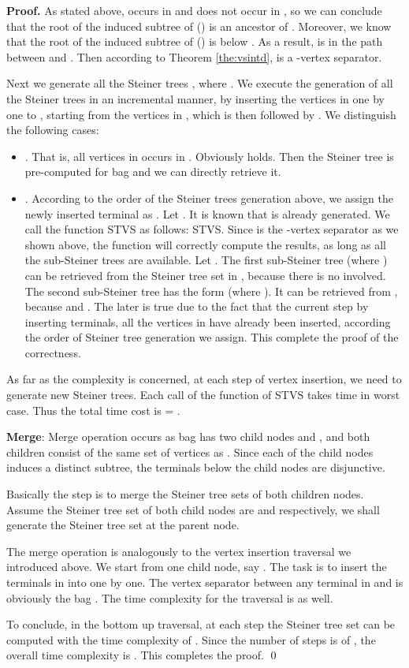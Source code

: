 \documentclass[preprint,12pt]{elsarticle}
\newenvironment{proof}{\begin{trivlist}\item[]\textbf{Proof.}}{\end{trivlist}}
\begin{document}
\begin{proof}
As stated above,  occurs in  and does not occur in , so
we can conclude that the root of the induced subtree of   () is an ancestor 
of . Moreover, we know that the root of the induced subtree of   () is below
. As a result,  is in the path between  and .
Then according to Theorem \ref{the:vsintd},  is a -vertex separator.

Next we generate all the Steiner trees , where
 . 
We execute the generation of all the Steiner trees in an incremental manner, 
by inserting the vertices in  one by one to , starting from
the vertices in , which is then followed by .
We distinguish the following cases:
\begin{itemize}
\item
. That is, all vertices in  occurs in . Obviously 
 holds. Then the Steiner tree  is pre-computed
for bag  and we can directly retrieve it.
\item 
. According to the order of the Steiner trees generation above, we assign the newly inserted terminal as . 
Let .
It is known that  is already generated.
We call the function STVS as follows: 
STVS. Since  is the -vertex separator as we shown above,
the function will correctly compute the results, as long as all the sub-Steiner trees are available.
Let . The first sub-Steiner tree  (where )
can be retrieved from the Steiner tree set in , because there is no  involved.
The second sub-Steiner tree has the form  (where ).
It can be retrieved from , because  and 
. The later is true due to the fact that the current step by inserting terminals,
all the vertices in  have already been inserted, according the order of Steiner tree generation we assign.
This complete the proof of the correctness.
\end{itemize}

As far as the complexity is concerned, at each step of vertex insertion, 
we need to generate  new Steiner trees. Each call of the function of STVS
takes time  in worst case. Thus the total time cost 
is  = .

\noindent 
{\bf Merge}: Merge operation occurs as bag  has two child nodes  and ,
and both children consist of the same set of vertices as .
Since each of the child nodes induces a distinct subtree, the terminals below the child nodes
are disjunctive. 


Basically the step is to merge the Steiner tree sets of both children nodes.
Assume the Steiner tree set of both child nodes are 
and  respectively, we shall generate the Steiner tree
set   at the parent node.

The merge operation is analogously to the vertex insertion traversal we introduced above.
We start from one child node, say . The task is to insert the terminals 
in  into  one by one.
The vertex separator between any terminal in  and 
is obviously the bag .
The time complexity for the traversal is   as well.

To conclude, in the bottom up traversal, at each step the Steiner tree set can be computed
with the time complexity of . 
Since the number of steps is of ,
the overall time complexity 
is . This completes the proof. \qed
\end{proof}
\end{document}
